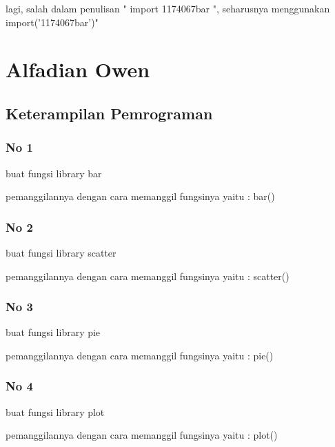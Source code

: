 lagi, salah dalam penulisan " import 1174067\textunderscore bar ", seharusnya menggunakan \textunderscore \textunderscore import\textunderscore \textunderscore('1174067\textunderscore bar')"

\section{Alfadian Owen}
\subsection{Keterampilan Pemrograman}
\subsubsection{No 1}

\hfill \break

buat fungsi library bar 

pemanggilannya dengan cara memanggil fungsinya yaitu : bar()

\subsubsection{No 2}

\hfill \break

buat fungsi library scatter

pemanggilannya dengan cara memanggil fungsinya yaitu : scatter()

\subsubsection{No 3}

\hfill \break

buat fungsi library pie

pemanggilannya dengan cara memanggil fungsinya yaitu : pie()

\subsubsection{No 4}

\hfill \break

buat fungsi library plot

pemanggilannya dengan cara memanggil fungsinya yaitu : plot()

